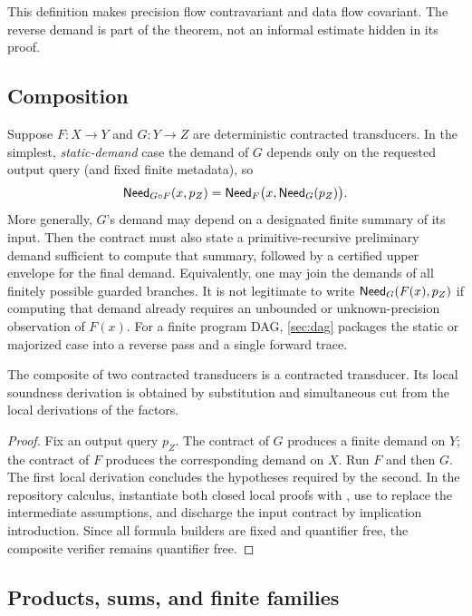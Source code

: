 This definition makes precision flow contravariant and data flow covariant.
The reverse demand is part of the theorem, not an informal estimate hidden in
its proof.

\subsection{Composition}

Suppose \(F:X\to Y\) and \(G:Y\to Z\) are deterministic contracted
transducers.  In the simplest, \emph{static-demand} case the demand of \(G\)
depends only on the requested output query (and fixed finite metadata), so
\[
  \mathsf{Need}_{G\circ F}(x,p_Z)
    =\mathsf{Need}_F\bigl(x,\mathsf{Need}_G(p_Z)\bigr).
\]
More generally, \(G\)'s demand may depend on a designated finite summary of its
input.  Then the contract must also state a primitive-recursive preliminary
demand sufficient to compute that summary, followed by a certified upper
envelope for the final demand.  Equivalently, one may join the demands of all
finitely possible guarded branches.  It is not legitimate to write
\(\mathsf{Need}_G(F(x),p_Z)\) if computing that demand already requires an unbounded or
unknown-precision observation of \(F(x)\).  For a finite program DAG,
\cref{sec:dag} packages the static or majorized case into a reverse pass and a
single forward trace.

\begin{theorem}
The composite of two contracted transducers is a contracted transducer.  Its
local soundness derivation is obtained by substitution and simultaneous cut
from the local derivations of the factors.
\end{theorem}

\begin{proof}
Fix an output query \(p_Z\).  The contract of \(G\) produces a finite demand
on \(Y\); the contract of \(F\) produces the corresponding demand on \(X\).
Run \(F\) and then \(G\).  The first local derivation concludes the hypotheses
required by the second.  In the repository calculus, instantiate both closed
local proofs with , use  to replace the
intermediate assumptions, and discharge the input contract by implication
introduction.  Since all formula builders are fixed and quantifier free, the
composite verifier remains quantifier free.
\end{proof}

\subsection{Products, sums, and finite families}


